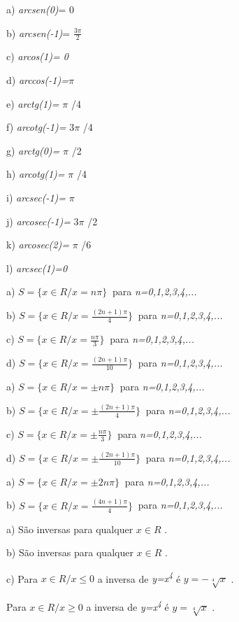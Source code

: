 \begin{respostas}{7}
\ansitem{}
\begin{multicols}{3}
a) \textit{arcsen(0)}= 0

b) \textit{arcsen(-1)}=  \(  \frac{3 \pi }{2} \)

c) \textit{arcos(1)= 0}

d) \textit{arccos(-1)=}$ \pi $

e) \textit{arctg(1)= }$ \pi $ /4

f) \textit{arcotg(-1)=} 3$ \pi $ /4

g) \textit{arctg(0)=} $ \pi $ /2

h) \textit{arcotg(1)=} $ \pi $ /4

i) \textit{arcsec(-1)=} $ \pi $

j) \textit{arcosec(-1)=} 3$ \pi $ /2

k) \textit{arcosec(2)=} $ \pi $ /6

l) \textit{arcsec(1)=0}
\end{multicols}

\ansitem{} a)  \( S= \{ x \in R /x =n \pi  \} ~  \) para \textit{n=0,1,2,3,4,...}

b) \( S= \{ x \in R /x =\frac{ \left( 2n+1 \right)  \pi }{4} \} ~  \) para \textit{n=0,1,2,3,4,...}

c) \( S= \{ x \in R /x =\frac{n \pi }{3} \} ~  \) para \textit{n=0,1,2,3,4,...}

d) \( S= \{ x \in R /x =\frac{ \left( 2n+1 \right)  \pi }{10} \} ~  \) para \textit{n=0,1,2,3,4,...}

\ansitem{} a) \( S= \{ x \in R /x = \pm n \pi  \} ~  \) para \textit{n=0,1,2,3,4,...}

b) \( S= \{ x \in R /x = \pm \frac{ \left( 2n+1 \right)  \pi }{4} \} ~  \) para \textit{n=0,1,2,3,4,...}

c) \( S= \{ x \in R /x = \pm \frac{n \pi }{3} \} ~  \) para \textit{n=0,1,2,3,4,...}

d) \( S= \{ x \in R /x = \pm \frac{ \left( 2n+1 \right)  \pi }{10} \} ~  \) para \textit{n=0,1,2,3,4,...}

\ansitem{} a)   \( S= \{ x \in R /x = \pm 2n \pi  \} ~  \) para \textit{n=0,1,2,3,4,...}

b)  \( S= \{ x \in R /x =\frac{ \left( 4n+1 \right)  \pi }{4} \} ~  \) para \textit{n=0,1,2,3,4,...}

\ansitem{} a) São inversas para qualquer  \( x \in R  \) .

b) São inversas para qualquer  \( x \in R  \) .

c) Para  \( x \in R/ x  \leq 0 \)   a inversa de \textit{y=x\textsuperscript{4}   } é    \( y=-\sqrt[4]{x} \) .

Para  \( x \in R/ x  \geq 0 \)   a inversa de \textit{y=x\textsuperscript{4}   } é    \( y=\sqrt[4]{x} \) .
\end{respostas}